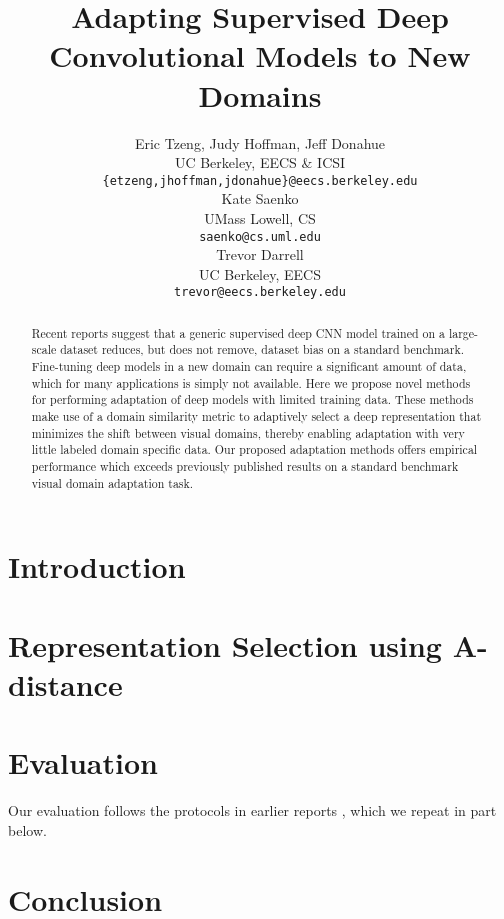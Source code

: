 \documentclass{article} %
\title{Adapting Supervised Deep Convolutional Models to New Domains}
\author{
Eric Tzeng, Judy Hoffman, Jeff Donahue \\
UC Berkeley, EECS \& ICSI\\
\footnotesize{\texttt{\{etzeng,jhoffman,jdonahue\}@eecs.berkeley.edu} }\\
\And
Kate Saenko \\
UMass Lowell, CS  \\
\footnotesize{\texttt{saenko@cs.uml.edu}} \\
\And
Trevor Darrell \\
UC Berkeley, EECS\\
\footnotesize{\texttt{trevor@eecs.berkeley.edu}} \\
}
\begin{document}
\maketitle

\begin{abstract}
Recent reports suggest that  a generic supervised deep CNN model trained on a large-scale dataset reduces, but does not remove, dataset bias on a standard benchmark. Fine-tuning deep models in a new domain can require a significant amount of data, which for many applications is simply not available. Here
we propose novel methods for performing adaptation of deep models with limited training data.
These methods make use of a domain similarity metric to adaptively select a deep representation that minimizes the shift between visual domains, thereby enabling adaptation with very little labeled domain specific data.
Our proposed adaptation methods offers empirical performance which exceeds previously published results on a standard benchmark visual domain adaptation task.

\end{abstract}

\section{Introduction}


%

\vspace{-.3cm}
\section{Representation Selection using A-distance}
\label{sec:adapt-algs}
\vspace{-.2cm}


\section{Evaluation}
Our evaluation follows the protocols in earlier reports \cite{deeplearning-arxiv-2013,hoffman-iclr14}, which we repeat in part below.


\section{Conclusion}



\small{


}
\end{document}
